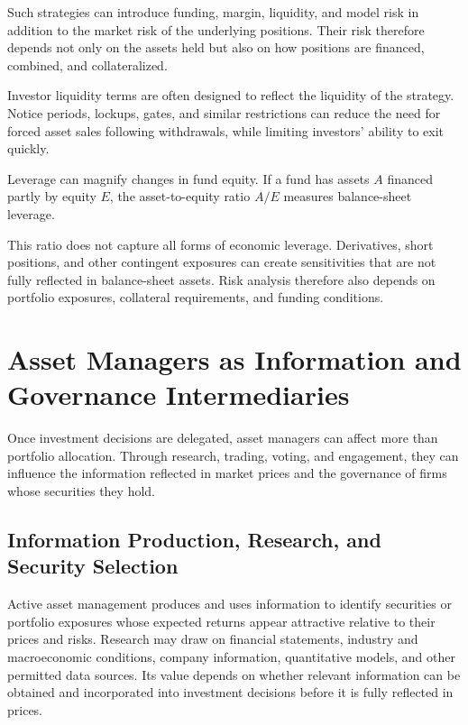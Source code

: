 Such strategies can introduce funding, margin, liquidity, and model risk in addition to the market risk of the underlying positions. Their risk therefore depends not only on the assets held but also on how positions are financed, combined, and collateralized.

Investor liquidity terms are often designed to reflect the liquidity of the strategy. Notice periods, lockups, gates, and similar restrictions can reduce the need for forced asset sales following withdrawals, while limiting investors' ability to exit quickly.

Leverage can magnify changes in fund equity. If a fund has assets $A$ financed partly by equity $E$, the asset-to-equity ratio $A/E$ measures balance-sheet leverage.

This ratio does not capture all forms of economic leverage. Derivatives, short positions, and other contingent exposures can create sensitivities that are not fully reflected in balance-sheet assets. Risk analysis therefore also depends on portfolio exposures, collateral requirements, and funding conditions.

\section[Asset Managers as Information and Governance Intermediaries]{Asset Managers as Information and\\ Governance Intermediaries}

Once investment decisions are delegated, asset managers can affect more than portfolio allocation. Through research, trading, voting, and engagement, they can influence the information reflected in market prices and the governance of firms whose securities they hold.

\subsection{Information Production, Research, and Security Selection}

Active asset management produces and uses information to identify securities or portfolio exposures whose expected returns appear attractive relative to their prices and risks. Research may draw on financial statements, industry and macroeconomic conditions, company information, quantitative models, and other permitted data sources. Its value depends on whether relevant information can be obtained and incorporated into investment decisions before it is fully reflected in prices.

